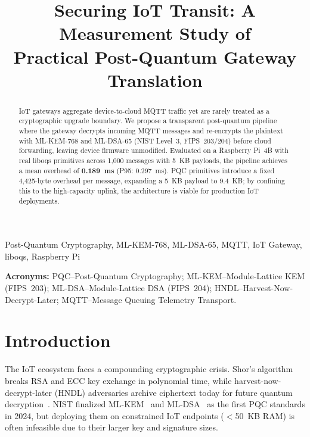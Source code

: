 \documentclass[conference]{IEEEtran}
\begin{document}
\title{Securing IoT Transit: A Measurement Study of\\Practical Post-Quantum Gateway Translation}

\author{
}

\maketitle

\begin{abstract}
IoT gateways aggregate device-to-cloud MQTT traffic yet are rarely treated as a cryptographic upgrade boundary. We propose a transparent post-quantum pipeline where the gateway decrypts incoming MQTT messages and re-encrypts the plaintext with ML-KEM-768 and ML-DSA-65 (NIST Level~3, FIPS~203/204) before cloud forwarding, leaving device firmware unmodified. Evaluated on a Raspberry Pi~4B with real liboqs primitives across 1,000 messages with 5~KB payloads, the pipeline achieves a mean overhead of \textbf{0.189~ms} (P95: 0.297~ms). PQC primitives introduce a fixed 4,425-byte overhead per message, expanding a 5~KB payload to 9.4~KB; by confining this to the high-capacity uplink, the architecture is viable for production IoT deployments.
\end{abstract}

\begin{IEEEkeywords}
Post-Quantum Cryptography, ML-KEM-768, ML-DSA-65, MQTT, IoT Gateway, liboqs, Raspberry Pi
\end{IEEEkeywords}

\noindent\textbf{Acronyms:} PQC--Post-Quantum Cryptography; ML-KEM--Module-Lattice KEM (FIPS~203); ML-DSA--Module-Lattice DSA (FIPS~204); HNDL--Harvest-Now-Decrypt-Later; MQTT--Message Queuing Telemetry Transport.

\section{Introduction}

The IoT ecosystem faces a compounding cryptographic crisis. Shor's algorithm~\cite{shor1994} breaks RSA and ECC key exchange in polynomial time, while harvest-now-decrypt-later (HNDL) adversaries archive ciphertext today for future quantum decryption~\cite{mosca2018}. NIST finalized ML-KEM~\cite{nist_fips203} and ML-DSA~\cite{nist_fips204} as the first PQC standards in 2024, but deploying them on constrained IoT endpoints ($<$50~KB RAM) is often infeasible due to their larger key and signature sizes.
\end{document}
